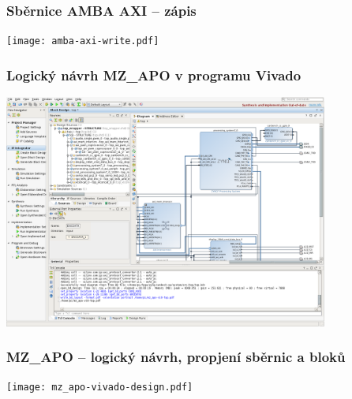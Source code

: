 \documentclass{beamer}
\begin{document}
\begin{frame}
\frametitle{Sběrnice AMBA AXI -- zápis}

\begin{center}
\texttt{[image: amba-axi-write.pdf]}
\end{center}

\end{frame}

\begin{frame}
\frametitle{Logický návrh MZ\_APO v programu Vivado}
  \begin{center}
    \includegraphics[width=0.8\textwidth]{fig/mz_apo-vivado-screenshot.png}
  \end{center}
\end{frame}

\begin{frame}
\frametitle{MZ\_APO -- logický návrh, propjení sběrnic a bloků}

\texttt{[image: mz\_apo-vivado-design.pdf]}

\end{frame}
\end{document}
